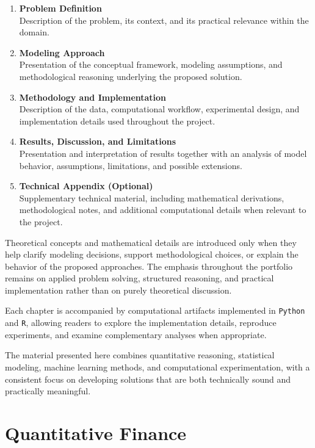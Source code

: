 \documentclass[
  12pt,
  letterpaper,
]{book}
\begin{document}
\begin{enumerate}
\def\labelenumi{\arabic{enumi}.}
\item
  \textbf{Problem Definition}\\
  Description of the problem, its context, and its practical relevance
  within the domain.
\item
  \textbf{Modeling Approach}\\
  Presentation of the conceptual framework, modeling assumptions, and
  methodological reasoning underlying the proposed solution.
\item
  \textbf{Methodology and Implementation}\\
  Description of the data, computational workflow, experimental design,
  and implementation details used throughout the project.
\item
  \textbf{Results, Discussion, and Limitations}\\
  Presentation and interpretation of results together with an analysis
  of model behavior, assumptions, limitations, and possible extensions.
\item
  \textbf{Technical Appendix (Optional)}\\
  Supplementary technical material, including mathematical derivations,
  methodological notes, and additional computational details when
  relevant to the project.
\end{enumerate}

Theoretical concepts and mathematical details are introduced only when
they help clarify modeling decisions, support methodological choices, or
explain the behavior of the proposed approaches. The emphasis throughout
the portfolio remains on applied problem solving, structured reasoning,
and practical implementation rather than on purely theoretical
discussion.

Each chapter is accompanied by computational artifacts implemented in
\texttt{Python} and \texttt{R}, allowing readers to explore the
implementation details, reproduce experiments, and examine complementary
analyses when appropriate.

The material presented here combines quantitative reasoning, statistical
modeling, machine learning methods, and computational experimentation,
with a consistent focus on developing solutions that are both
technically sound and practically meaningful.

\part{Quantitative Finance}
\end{document}
